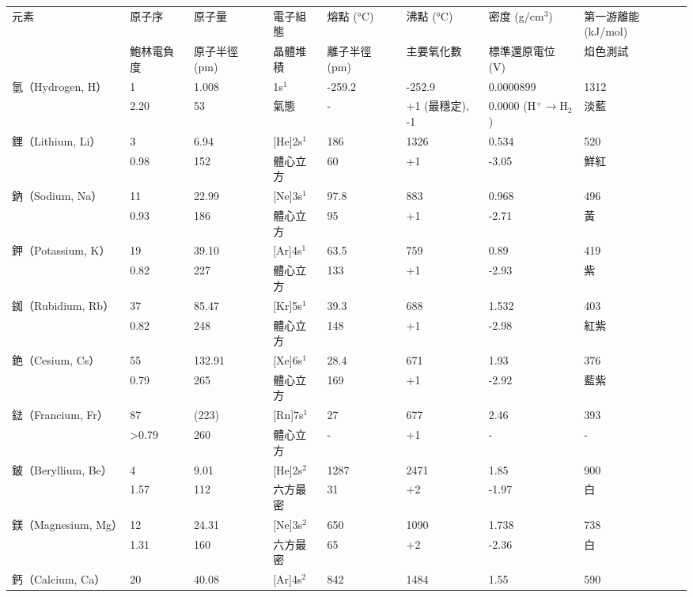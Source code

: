 \documentclass[a4paper,12pt]{report}
\begin{document}
\begin{longtable}[c]{|p{}|p{}|p{}|p{}|p{}|p{}|p{}|p{}|}
\hline
元素 & 原子序 & 原子量 & 電子組態 & 熔點 (°C) & 沸點 (°C) & 密度 (g/cm$^3$) & 第一游離能 (kJ/mol)\\\cline{2-8}
& 鮑林電負度 & 原子半徑 (pm) & 晶體堆積 & 離子半徑 (pm) & 主要氧化數 & 標準還原電位 (V) & 焰色測試\\\hline
\endhead
氫（Hydrogen, H） & 1 & 1.008 & 1s$^1$ & -259.2 & -252.9 & 0.0000899 & 1312\\\cline{2-8}
& 2.20 & 53 & 氣態 & - & +1 (最穩定), -1 & 0.0000 (H$^+\to$H$_2$) & 淡藍\\\hline
鋰（Lithium, Li） & 3 & 6.94 & [He]2s$^1$ & 186 & 1326 & 0.534 & 520\\\cline{2-8}
& 0.98 & 152 & 體心立方 & 60 & +1 & -3.05 & 鮮紅\\\hline
鈉（Sodium, Na） & 11 & 22.99 & [Ne]3s$^1$ & 97.8 & 883 & 0.968 & 496\\\cline{2-8}
& 0.93 & 186 & 體心立方 & 95 & +1 & -2.71 & 黃\\\hline
鉀（Potassium, K） & 19 & 39.10 & [Ar]4s$^1$ & 63.5 & 759 & 0.89 & 419\\\cline{2-8}
& 0.82 & 227 & 體心立方 & 133 & +1 & -2.93 & 紫\\\hline
銣（Rubidium, Rb） & 37 & 85.47 & [Kr]5s$^1$ & 39.3 & 688 & 1.532 & 403\\\cline{2-8}
& 0.82 & 248 & 體心立方 & 148 & +1 & -2.98 & 紅紫\\\hline
銫（Cesium, Cs） & 55 & 132.91 & [Xe]6s$^1$ & 28.4 & 671 & 1.93 & 376\\\cline{2-8}
& 0.79 & 265 & 體心立方 & 169 & +1 & -2.92 & 藍紫\\\hline
鍅（Francium, Fr） & 87 & (223) & [Rn]7s$^1$ & 27 & 677 & 2.46 & 393\\\cline{2-8}
& >0.79 & 260 & 體心立方 & - & +1 & - & -\\\hline
鈹（Beryllium, Be） & 4 & 9.01 & [He]2s$^2$ & 1287 & 2471 & 1.85 & 900\\\cline{2-8}
& 1.57 & 112 & 六方最密 & 31 & +2 & -1.97 & 白\\\hline
鎂（Magnesium, Mg） & 12 & 24.31 & [Ne]3s$^2$ & 650 & 1090 & 1.738 & 738\\\cline{2-8}
& 1.31 & 160 & 六方最密 & 65 & +2 & -2.36 & 白\\\hline
鈣（Calcium, Ca） & 20 & 40.08 & [Ar]4s$^2$ & 842 & 1484 & 1.55 & 590\\\cline{2-8}

\end{longtable}
\end{document}
